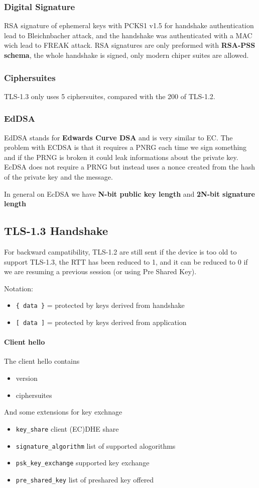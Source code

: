 \documentclass[12pt]{article}
\begin{document}
\subsubsection{Digital Signature}
RSA signature of ephemeral keys with PCKS1 v1.5 for handshake authentication lead to Bleichnbacher attack, and the handshake was authenticated with a MAC wich lead to FREAK attack. RSA signatures are only preformed with \textbf{RSA-PSS schema}, the whole handshake is signed, only modern chiper suites are allowed.

\subsubsection{Ciphersuites}
TLS-1.3 only uses 5 ciphersuites, compared with the 200 of TLS-1.2. 

\subsubsection{EdDSA}
EdDSA stands for \textbf{Edwards Curve DSA} and is very similar to EC. The problem with ECDSA is that it requires a PNRG each time we sign something and if the PRNG is broken it could leak informations about the private key. EcDSA does not require a PRNG but instead uses a nonce created from the hash of the private key and the message.

In general on EcDSA we have \textbf{N-bit public key length} and \textbf{2N-bit signature length}

\subsection{TLS-1.3 Handshake}
For backward campatibility, TLS-1.2 are still sent if the device is too old to support TLS-1.3, the RTT has been reduced to 1, and it can be reduced to 0 if we are resuming a previous session (or using Pre Shared Key). 

Notation:
\begin{itemize}
  \item \verb|{ data }| = protected by keys derived from handshake
  \item \verb|[ data ]| = protected by keys derived from application
\end{itemize}

\paragraph{Client hello}
The client hello contains
\begin{itemize}
  \item version 
  \item ciphersuites 
\end{itemize}
And some extensions for key exchnage
\begin{itemize}
  \item \verb|key_share| client (EC)DHE share
  \item \verb|signature_algorithm| list of supported alogorithms
  \item \verb|psk_key_exchange| supported key exchange
  \item \verb|pre_shared_key| list of preshared key offered
\end{itemize}
\end{document}
